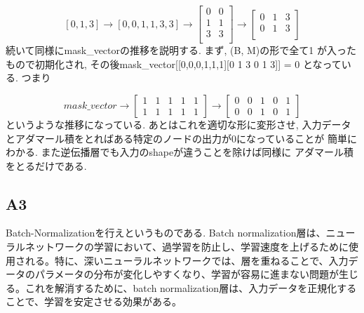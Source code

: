 \documentclass[a4paper,11pt]{jsarticle}
\begin{document}
$$
  [0, 1, 3] \rightarrow [0, 0, 1, 1, 3, 3] \rightarrow
  \begin{bmatrix}
    0 & 0 \\
    1 & 1 \\
    3 & 3 \\
  \end{bmatrix}
  \rightarrow \begin{bmatrix}
    0 & 1 & 3 \\
    0 & 1 & 3 \\
  \end{bmatrix}
$$
続いて同様にmask\_vectorの推移を説明する. まず, (B, M)の形で全て1
が入ったもので初期化され, その後mask\_vector[[0,0,0,1,1,1][0 1 3 0 1 3]] = 0
となっている. つまり

$$
  mask\_vector \rightarrow \begin{bmatrix}
    1 & 1 & 1 & 1 & 1 \\
    1 & 1 & 1 & 1 & 1
  \end{bmatrix} \rightarrow
  \begin{bmatrix}
    0 & 0 & 1 & 0 & 1 \\
    0 & 0 & 1 & 0 & 1
  \end{bmatrix}
$$
というような推移になっている. あとはこれを適切な形に変形させ,
入力データとアダマール積をとればある特定のノードの出力が0になっていることが
簡単にわかる. また逆伝播層でも入力のshapeが違うことを除けば同様に
アダマール積をとるだけである.
\subsection{A3}
Batch-Normalizationを行えというものである.
Batch normalization層は、ニューラルネットワークの学習において、過学習を防止し、学習速度を上げるために使用される。特に、深いニューラルネットワークでは、層を重ねることで、入力データのパラメータの分布が変化しやすくなり、学習が容易に進まない問題が生じる。これを解消するために、batch normalization層は、入力データを正規化することで、学習を安定させる効果がある。
\end{document}
